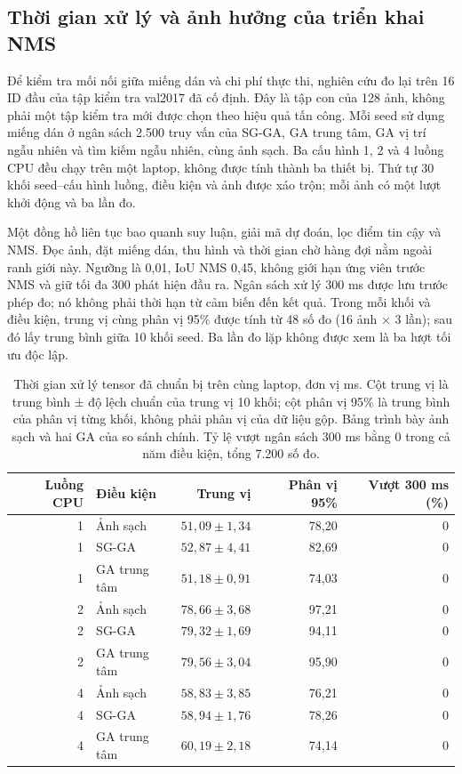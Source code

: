 \documentclass[a4paper,fleqn]{cas-dc}
\begin{document}
\subsection{Thời gian xử lý và ảnh hưởng của triển khai NMS}

Để kiểm tra mối nối giữa miếng dán và chi phí thực thi, nghiên cứu đo lại trên 16 ID đầu của tập kiểm tra val2017 đã cố định. Đây là tập con của 128 ảnh, không phải một tập kiểm tra mới được chọn theo hiệu quả tấn công. Mỗi seed sử dụng miếng dán ở ngân sách 2.500 truy vấn của SG-GA, GA trung tâm, GA vị trí ngẫu nhiên và tìm kiếm ngẫu nhiên, cùng ảnh sạch. Ba cấu hình 1, 2 và 4 luồng CPU đều chạy trên một laptop, không được tính thành ba thiết bị. Thứ tự 30 khối seed--cấu hình luồng, điều kiện và ảnh được xáo trộn; mỗi ảnh có một lượt khởi động và ba lần đo.

Một đồng hồ liên tục bao quanh suy luận, giải mã dự đoán, lọc điểm tin cậy và NMS. Đọc ảnh, đặt miếng dán, thu hình và thời gian chờ hàng đợi nằm ngoài ranh giới này. Ngưỡng là 0,01, IoU NMS 0,45, không giới hạn ứng viên trước NMS và giữ tối đa 300 phát hiện đầu ra. Ngân sách xử lý 300 ms được lưu trước phép đo; nó không phải thời hạn từ cảm biến đến kết quả. Trong mỗi khối và điều kiện, trung vị cùng phân vị 95\% được tính từ 48 số đo (16 ảnh × 3 lần); sau đó lấy trung bình giữa 10 khối seed. Ba lần đo lặp không được xem là ba lượt tối ưu độc lập.

\begin{table}[t]
\centering
\small
\caption{Thời gian xử lý tensor đã chuẩn bị trên cùng laptop, đơn vị ms. Cột trung vị là trung bình ± độ lệch chuẩn của trung vị 10 khối; cột phân vị 95\% là trung bình của phân vị từng khối, không phải phân vị của dữ liệu gộp. Bảng trình bày ảnh sạch và hai GA của so sánh chính. Tỷ lệ vượt ngân sách 300 ms bằng 0 trong cả năm điều kiện, tổng 7.200 số đo.}
\begin{tabularx}{\textwidth}{rXrrr}
\toprule
Luồng CPU & Điều kiện & Trung vị & Phân vị 95\% & Vượt 300 ms (\%) \\
\midrule
1 & Ảnh sạch & $51{,}09\pm1{,}34$ & 78,20 & 0 \\
1 & SG-GA & $52{,}87\pm4{,}41$ & 82,69 & 0 \\
1 & GA trung tâm & $51{,}18\pm0{,}91$ & 74,03 & 0 \\
2 & Ảnh sạch & $78{,}66\pm3{,}68$ & 97,21 & 0 \\
2 & SG-GA & $79{,}32\pm1{,}69$ & 94,11 & 0 \\
2 & GA trung tâm & $79{,}56\pm3{,}04$ & 95,90 & 0 \\
4 & Ảnh sạch & $58{,}83\pm3{,}85$ & 76,21 & 0 \\
4 & SG-GA & $58{,}94\pm1{,}76$ & 78,26 & 0 \\
4 & GA trung tâm & $60{,}19\pm2{,}18$ & 74,14 & 0 \\
\bottomrule
\end{tabularx}
\label{tab:extended_processing}
\end{table}
\end{document}
